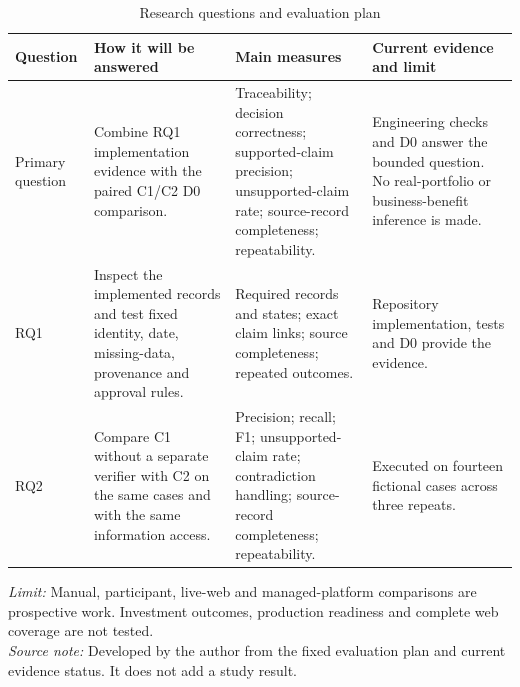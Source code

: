 \begin{table}[htbp]
  \centering
  \footnotesize
  \setlength{\tabcolsep}{2.2pt}
  \renewcommand{\arraystretch}{1.22}
  \begin{tabularx}{0.99\textwidth}{@{}P{0.12\textwidth}P{0.30\textwidth}Y P{0.22\textwidth}@{}}
    \toprule
    \textbf{Question} &
    \textbf{How it will be answered} &
    \textbf{Main measures} &
    \textbf{Current evidence and limit} \\
    \midrule
    Primary question &
    Combine RQ1 implementation evidence with the paired C1/C2 D0 comparison. &
    Traceability; decision correctness; supported-claim precision; unsupported-claim rate; source-record completeness; repeatability. &
    Engineering checks and D0 answer the bounded question. No real-portfolio or business-benefit inference is made. \\
    \addlinespace
    RQ1 &
    Inspect the implemented records and test fixed identity, date, missing-data, provenance and approval rules. &
    Required records and states; exact claim links; source completeness; repeated outcomes. &
    Repository implementation, tests and D0 provide the evidence. \\
    \addlinespace
    RQ2 &
    Compare C1 without a separate verifier with C2 on the same cases and with the same information access. &
    Precision; recall; F1; unsupported-claim rate; contradiction handling; source-record completeness; repeatability. &
    Executed on fourteen fictional cases across three repeats. \\
    \bottomrule
  \end{tabularx}

  \caption{Research questions and evaluation plan}
  \label{tab:research-contract}
  \vspace{3pt}

  \parbox{0.99\textwidth}{\scriptsize
    \textit{Limit:} Manual, participant, live-web and managed-platform comparisons are prospective work. Investment outcomes, production readiness and complete web coverage are not tested.\\
    \textit{Source note:} Developed by the author from the fixed evaluation plan and current evidence status. It does not add a study result.
  }
\end{table}
\clearpage
